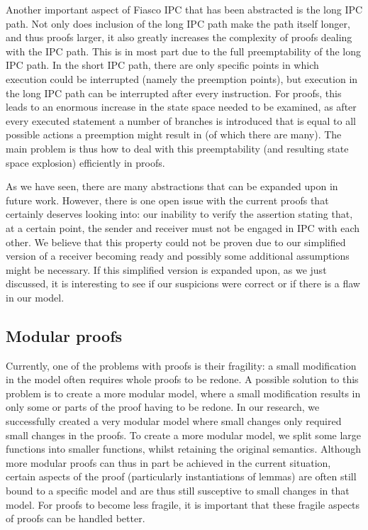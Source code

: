 Another important aspect of Fiasco IPC that has been abstracted is the long IPC path. Not only does inclusion of the long IPC path make the path itself longer, and thus proofs larger, it also greatly increases the complexity of proofs dealing with the IPC path. This is in most part due to the full preemptability of the long IPC path. In the short IPC path, there are only specific points in which execution could be interrupted (namely the preemption points), but execution in the long IPC path can be interrupted after every instruction. For proofs, this leads to an enormous increase in the state space needed to be examined, as after every executed statement a number of branches is introduced that is equal to all possible actions a preemption might result in (of which there are many). The main problem is thus how to deal with this preemptability (and resulting state space explosion) efficiently in proofs.\emptyline

As we have seen, there are many abstractions that can be expanded upon in future work. However, there is one open issue with the current proofs that certainly deserves looking into: our inability to verify the assertion stating that, at a certain point, the sender and receiver must not be engaged in IPC with each other. We believe that this property could not be proven due to our simplified version of a receiver becoming ready and possibly some additional assumptions might be necessary. If this simplified version is expanded upon, as we just discussed, it is interesting to see if our suspicions were correct or if there is a flaw in our model.

\subsection{Modular proofs}
Currently, one of the problems with proofs is their fragility: a small modification in the model often requires whole proofs to be redone. A possible solution to this problem is to create a more modular model, where a small modification results in only some or parts of the proof having to be redone. In our research, we successfully created a very modular model where small changes only required small changes in the proofs. To create a more modular model, we split some large functions into smaller functions, whilst retaining the original semantics. Although more modular proofs can thus in part be achieved in the current situation, certain aspects of the proof (particularly instantiations of lemmas) are often still bound to a specific model and are thus still susceptive to small changes in that model. For proofs to become less fragile, it is important that these fragile aspects of proofs can be handled better.

